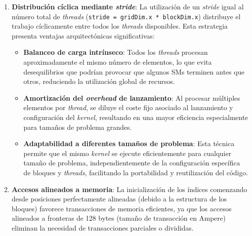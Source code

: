\begin{enumerate}
\begin{itemize}
                \end{itemize}
            
            \item \textbf{Distribución cíclica mediante \textit{stride}}: La utilización de un \textit{stride} igual al número total de \textit{threads} (\texttt{stride = gridDim.x * blockDim.x}) distribuye el trabajo cíclicamente entre todos los \textit{threads} disponibles. Esta estrategia presenta ventajas arquitectónicas significativas:
            
                \begin{itemize}
                
                    \item \textbf{Balanceo de carga intrínseco}: Todos los \textit{threads} procesan aproximadamente el mismo número de elementos, lo que evita desequilibrios que podrían provocar que algunos SMs terminen antes que otros, reduciendo la utilización global de recursos.
                    
                    \item \textbf{Amortización del \textit{overhead} de lanzamiento}: Al procesar múltiples elementos por \textit{thread}, se diluye el coste fijo asociado al lanzamiento y configuración del \textit{kernel}, resultando en una mayor eficiencia especialmente para tamaños de problema grandes.
                    
                    \item \textbf{Adaptabilidad a diferentes tamaños de problema}: Esta técnica permite que el mismo \textit{kernel} se ejecute eficientemente para cualquier tamaño de problema, independientemente de la configuración específica de bloques y \textit{threads}, facilitando la portabilidad y reutilización del código.
                    
                \end{itemize}
            
            \item \textbf{Accesos alineados a memoria}: La inicialización de los índices comenzando desde posiciones perfectamente alineadas (debido a la estructura de los bloques) favorece transacciones de memoria eficientes, ya que los accesos alineados a fronteras de 128 bytes (tamaño de transacción en Ampere) eliminan la necesidad de transacciones parciales o divididas.
            
        \end{enumerate}

